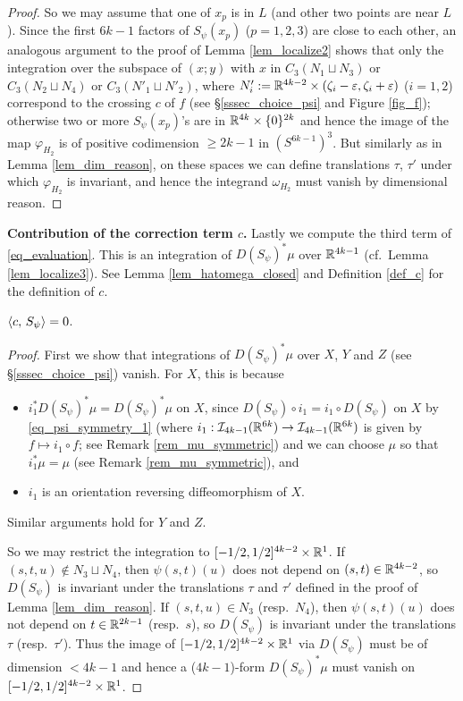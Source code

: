 \begin{proof}
So we may assume that one of $x_p$ is in $L$ (and other two points are near $L$).
Since the first $6k-1$ factors of $S_{\psi}(x_p )$ ($p=1,2,3$) are close to each other, an analogous argument to the
proof of Lemma \ref{lem_localize2} shows that only the integration over the subspace of $(x;y)$ with $x$ in
$C_3 (N_1 \sqcup N_3 )$ or $C_3 (N_2 \sqcup N_4 )$ or $C_3 (N'_1 \sqcup N'_2 )$, where
$N'_i :=\mathbb{R}^{4k-2}\times (\zeta_i -\varepsilon ,\zeta_i +\varepsilon )$ ($i=1,2$) correspond to the crossing $c$ of $f$
(see \S \ref{sssec_choice_psi} and Figure \ref{fig_f}); otherwise two or more $S_{\psi}(x_p )$'s are in
$\mathbb{R}^{4k}\times \{ 0\}^{2k}$ and hence the image of the map $\varphi_{H_2}$ is of positive codimension $\ge 2k-1$ in
$(S^{6k-1})^3$.
But similarly as in Lemma \ref{lem_dim_reason}, on these spaces we can define translations $\tau$, $\tau'$ under which
$\varphi_{H_2}$ is invariant, and hence the integrand $\omega_{H_2}$ must vanish by dimensional reason.
\end{proof}


\noindent
{\bf Contribution of the correction term $c$.}
Lastly we compute the third term of \eqref{eq_evaluation}.
This is an integration of $D(S_{\psi})^* \mu$ over $\mathbb{R}^{4k-1}$ (cf.\ Lemma \ref{lem_localize3}).
See Lemma \ref{lem_hatomega_closed} and Definition \ref{def_c} for the definition of $c$.


\begin{lem}\label{lem_ev_c}
$\langle {c},\, {S_{\psi}}\rangle=0$.
\end{lem}


\begin{proof}
First we show that integrations of $D(S_{\psi})^* \mu$ over $X$, $Y$ and $Z$ (see \S \ref{sssec_choice_psi}) vanish.
For $X$, this is because
\begin{itemize}
\item
 $i^*_1 D(S_{\psi})^* \mu =D(S_{\psi})^* \mu$ on $X$, since $D(S_{\psi})\circ i_1 =i_1 \circ D(S_{\psi})$ on $X$ by
 \eqref{eq_psi_symmetry_1} (where $i_1 : \mathcal{I}_{4k-1} (\mathbb{R}^{6k})\to \mathcal{I}_{4k-1} (\mathbb{R}^{6k})$ is given by $f\mapsto i_1 \circ f$;
 see Remark \ref{rem_mu_symmetric}) and we can choose $\mu$ so that $i^*_1 \mu =\mu$ (see Remark \ref{rem_mu_symmetric}),
 and
\item
 $i_1$ is an orientation reversing diffeomorphism of $X$.
\end{itemize}
Similar arguments hold for $Y$ and $Z$.


So we may restrict the integration to $[-1/2,1/2]^{4k-2}\times \mathbb{R}^1$.
If $(s,t,u)\not\in N_3 \sqcup N_4$, then $\psi (s,t)(u)$ does not depend on $(s,t)\in \mathbb{R}^{4k-2}$, so $D(S_{\psi})$ is
invariant under the translations $\tau$ and $\tau'$ defined in the proof of Lemma \ref{lem_dim_reason}.
If $(s,t,u)\in N_3$ (resp.\ $N_4$), then $\psi (s,t)(u)$ does not depend on $t\in \mathbb{R}^{2k-1}$ (resp.\ $s$), so
$D(S_{\psi})$ is invariant under the translations $\tau$ (resp.\ $\tau'$).
Thus  the image of $[-1/2,1/2]^{4k-2}\times \mathbb{R}^1$ via $D(S_{\psi})$ must be of dimension $<4k-1$ and hence
a ($4k-1$)-form $D(S_{\psi})^* \mu$ must vanish on $[-1/2,1/2]^{4k-2}\times \mathbb{R}^1$.
\end{proof}



